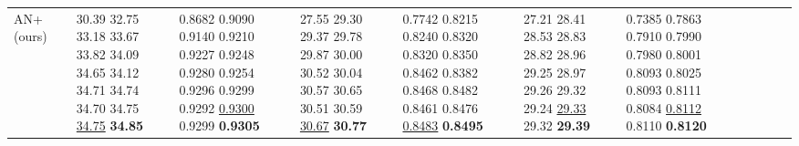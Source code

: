 \documentclass[runningheads]{llncs}
\begin{document}
\begin{table}[!ht]
\begin{tabular}{|p{7em}|p{2.5em}|p{2.5em}|p{3em}|p{2.5em}|p{3em}|p{2.5em}|p{3em}|p{2.5em}|p{3em}|p{2.5em}|p{3em}|}
AN+(ours)&
		 \newline{} \newline{} \newline{} \newline{} \newline{} \newline{} \newline{} \newline{} \newline{} \newline{} \newline{} \newline{} \newline{} & 30.39 \newline{}32.75 \newline{}33.18 \newline{}33.67 \newline{}33.82 \newline{}34.09 \newline{}34.65 \newline{}34.12 \newline{}34.71 \newline{}34.74 \newline{}34.70 \newline{}34.75 \newline{}\underline{34.75} \newline{}\bfseries{34.85} & 0.8682 \newline{}0.9090 \newline{}0.9140 \newline{}0.9210 \newline{}0.9227 \newline{}0.9248 \newline{}0.9280 \newline{}0.9254 \newline{}0.9296 \newline{}0.9299 \newline{}0.9292 \newline{}\underline{0.9300} \newline{}0.9299 \newline{}\bfseries{0.9305} & 27.55 \newline{}29.30 \newline{}29.37 \newline{}29.78 \newline{}29.87 \newline{}30.00 \newline{}30.52 \newline{}30.04 \newline{}30.57 \newline{}30.65 \newline{}30.51 \newline{}30.59 \newline{}\underline{30.67} \newline{}\bfseries{30.77} & 0.7742 \newline{}0.8215 \newline{}0.8240 \newline{}0.8320 \newline{}0.8320 \newline{}0.8350 \newline{}0.8462 \newline{}0.8382 \newline{}0.8468 \newline{}0.8482 \newline{}0.8461 \newline{}0.8476 \newline{}\underline{0.8483} \newline{}\bfseries{0.8495} & 27.21 \newline{}28.41 \newline{}28.53 \newline{}28.83 \newline{}28.82 \newline{}28.96 \newline{}29.25 \newline{}28.97 \newline{}29.26 \newline{}29.32 \newline{}29.24 \newline{}\underline{29.33} \newline{}29.32 \newline{}\bfseries{29.39}&  0.7385 \newline{}0.7863 \newline{}0.7910 \newline{}0.7990 \newline{}0.7980 \newline{}0.8001 \newline{}0.8093 \newline{}0.8025 \newline{}0.8093 \newline{}0.8111 \newline{}0.8084 \newline{}\underline{0.8112} \newline{}0.8110 \newline{}\bfseries{0.8120} 
\end{tabular}
\end{table}
\end{document}
